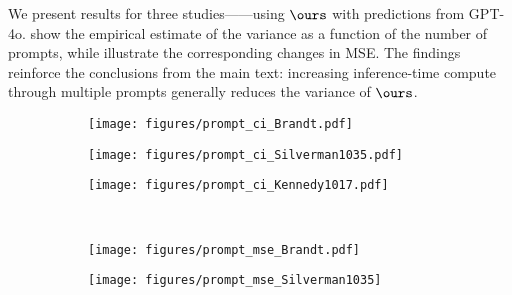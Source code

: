 We present results for three studies---\citet{brandt2013onset,silverman2022putting, kennedy2020accidental}---using $\ours$ with predictions from GPT-4o.  show the empirical estimate of the variance as a function of the number of prompts, while  illustrate the corresponding changes in MSE. The findings reinforce the conclusions from the main text: increasing inference-time compute through multiple prompts generally reduces the variance of $\ours$.



\begin{figure}[t!]

    \centering
    

        \begin{subfigure}[t]{0.3\textwidth}
        \texttt{[image: figures/prompt\_ci\_Brandt.pdf]}
         \caption{}
        \label{fig:prompt_ci_Brandt}
        \end{subfigure}
         \begin{subfigure}[t]{0.3\textwidth}
\texttt{[image: figures/prompt\_ci\_Silverman1035.pdf]}
         \caption{}
    \label{fig:prompt_ci_Silver}
        \end{subfigure}
        \begin{subfigure}[t]{0.3\textwidth}
        \texttt{[image: figures/prompt\_ci\_Kennedy1017.pdf]}
         \caption{}
    \label{fig:prompt_ci_Ken}
        \end{subfigure}\\
        \begin{subfigure}[t]{0.3\textwidth}
        \texttt{[image: figures/prompt\_mse\_Brandt.pdf]}
        \caption{}
        \label{fig:prompt_mse_b}
        \end{subfigure}
        \begin{subfigure}[t]{0.3\textwidth}
        \texttt{[image: figures/prompt\_mse\_Silverman1035]}
         \caption{}
            \label{fig:prompt_mse_s}


\end{subfigure}
\end{figure}
